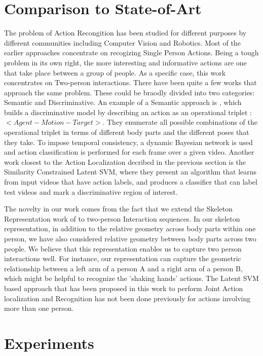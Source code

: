 \documentclass[10pt,twocolumn,letterpaper]{article}
\begin{document}
\section{Comparison to State-of-Art}
The problem of Action Recongition has been studied for different purposes by different communities including Computer Vision and Robotics. Most of the earlier approaches concentrate on recogizing Single Person Actions. Being a tough problem in its own right, the more interesting and informative actions are one that take place between a group of people. As a specific case, this work concentrates on Two-person interactions. There have been quite a few works that approach the same problem. These could be braodly divided into two categories: Semantic and Discriminative. An example of a Semantic approach is \cite{SUHA}, which builds a discriminative model by describing an action as an operational triplet : $<Agent-Motion-Target>$. They enumerate all possible combinations of the operational triplet in terms of different body parts and the different poses that they take. To impose temporal consistency, a dynamic Bayesian network is used and action classification is performed for each frame over a given video. Another work closest to the Action Localization decribed in the previous section is the Similarity Constrained Latent SVM, where they present an algorithm that learns from input videos that have action labels, and produces a classifier that can label test videos and mark a discriminative region of interest.

The novelty in our work comes from the fact that we extend the Skeleton Representation work of \cite{Vemulapalli2013} to two-person Interaction sequences. In our skeleton representation, in addition to the relative geometry across body parts within one person, we have also considered relative geometry between body parts across two people. We believe that this representation enables us to capture two person interactions well. For instance, our representation can capture the geometric relationship between a left arm of a person A and a right arm of a person B, which might be helpful to recognize the 'shaking hands' actions. The Latent SVM based approach that has been proposed in this work to perform Joint Action localization and Recognition has not been done previously for actions involving more than one person. 

\section{Experiments}
\end{document}
